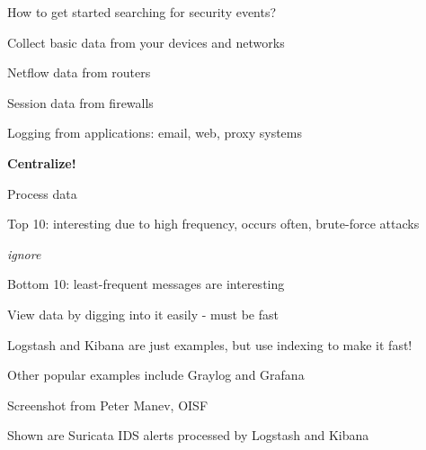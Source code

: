 \documentclass[Screen16to9,17pt]{foils}
\begin{document}



\begin{list1}
\item How to get started searching for security events?
\item Collect basic data from your devices and networks
\begin{list2}
\item Netflow data from routers
\item Session data from firewalls
\item Logging from applications: email, web, proxy systems
\end{list2}
\item {\bf Centralize!}
\item Process data
\begin{list2}
\item Top 10: interesting due to high frequency, occurs often, brute-force attacks
\item {\it ignore}
\item Bottom 10: least-frequent messages are interesting
\end{list2}
\end{list1}





\begin{list1}
\item View data by digging into it easily - must be fast
\item Logstash and Kibana are just examples, but use indexing to make it fast!
\item Other popular examples include Graylog and Grafana
\end{list1}




\vskip 2cm
\begin{list2}
\item Screenshot from Peter Manev, OISF
\item Shown are Suricata IDS alerts processed by Logstash and Kibana
\end{list2}


\end{document}
